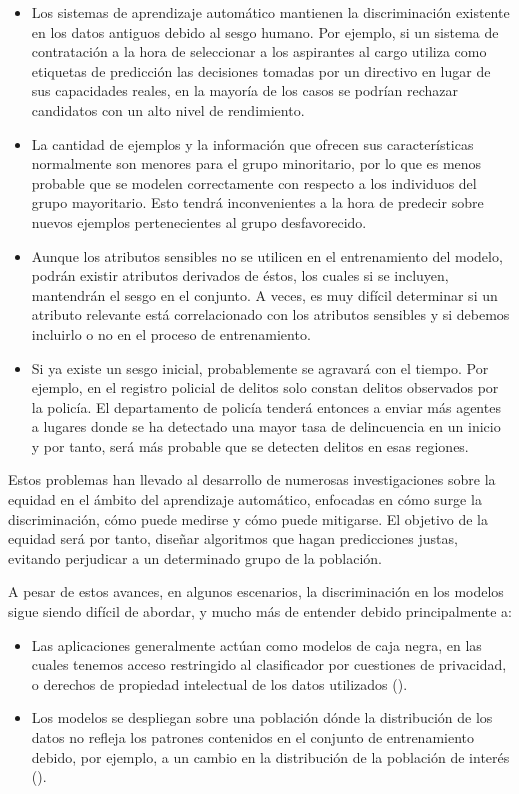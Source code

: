 \documentclass[oneside,openright,titlepage,numbers=noenddot,openany,headinclude,footinclude=true,
cleardoublepage=empty,abstractoff,BCOR=5mm,paper=a4,fontsize=12pt,main=spanish]{scrreprt}
\begin{document}
\begin{itemize}
    \item Los sistemas de aprendizaje automático mantienen la discriminación existente en los datos antiguos debido al sesgo humano. Por ejemplo, si un sistema de contratación a la hora de seleccionar a los aspirantes al cargo utiliza como etiquetas de predicción las decisiones tomadas por un directivo en lugar de sus capacidades reales, en la mayoría de los casos se podrían rechazar candidatos con un alto nivel de rendimiento.
    \item La cantidad de ejemplos y la información que ofrecen sus características normalmente son menores para el grupo minoritario, por lo que es menos probable que se modelen correctamente con respecto a los individuos del grupo mayoritario. Esto tendrá inconvenientes a la hora de predecir sobre nuevos ejemplos pertenecientes al grupo desfavorecido.
    \item Aunque los atributos sensibles no se utilicen en el entrenamiento del modelo, podrán existir atributos derivados de éstos, los cuales si se incluyen, mantendrán el sesgo en el conjunto. A veces, es muy difícil determinar si un atributo relevante está correlacionado con los atributos sensibles y si debemos incluirlo o no en el proceso de entrenamiento.
    \item Si ya existe un sesgo inicial, probablemente se agravará con el tiempo. Por ejemplo, en el registro policial de delitos solo constan delitos observados por la policía. El departamento de policía tenderá entonces a enviar más agentes a lugares donde se ha detectado una mayor tasa de delincuencia en un inicio y por tanto, será más probable que se detecten delitos en esas regiones. 
\end{itemize}

Estos problemas han llevado al desarrollo de numerosas investigaciones sobre la equidad en el ámbito del aprendizaje automático, enfocadas en cómo surge la discriminación, cómo puede medirse y cómo puede mitigarse. El objetivo de la equidad será por tanto, diseñar algoritmos que hagan predicciones justas, evitando perjudicar a un determinado grupo de la población.

A pesar de estos avances, en algunos escenarios, la discriminación en los modelos sigue siendo difícil de abordar, y mucho más de entender debido principalmente a: 

\begin{itemize}
    \item Las aplicaciones generalmente actúan como modelos de caja negra, en las cuales tenemos acceso restringido al clasificador por cuestiones de privacidad, o derechos de propiedad intelectual de los datos utilizados (\cite{blackbox2014}).
	\item Los modelos se despliegan sobre una población dónde la distribución de los datos no refleja los patrones contenidos en el conjunto de entrenamiento debido, por ejemplo, a un cambio en la distribución de la población de interés (\cite{distributionmodel2017}).
\end{itemize}
\end{document}
